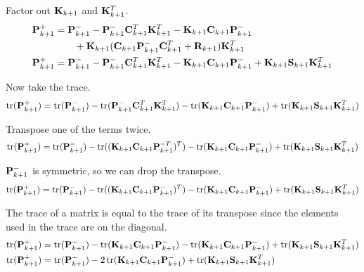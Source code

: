 Factor out $\mathbf{K}_{k+1}$ and $\mathbf{K}_{k+1}^T$.
\begin{align}
  \mathbf{P}_{k+1}^+ &=
    \mathbf{P}_{k+1}^- - \mathbf{P}_{k+1}^-\mathbf{C}_{k+1}^T\mathbf{K}_{k+1}^T -
    \mathbf{K}_{k+1}\mathbf{C}_{k+1}\mathbf{P}_{k+1}^- \nonumber \\
    &\qquad + \mathbf{K}_{k+1}(\mathbf{C}_{k+1}\mathbf{P}_{k+1}^-\mathbf{C}_{k+1}^T +
    \mathbf{R}_{k+1})\mathbf{K}_{k+1}^T \nonumber \\
  \mathbf{P}_{k+1}^+ &=
    \mathbf{P}_{k+1}^- - \mathbf{P}_{k+1}^-\mathbf{C}_{k+1}^T\mathbf{K}_{k+1}^T -
    \mathbf{K}_{k+1}\mathbf{C}_{k+1}\mathbf{P}_{k+1}^- +
    \mathbf{K}_{k+1}\mathbf{S}_{k+1}\mathbf{K}_{k+1}^T \label{eq:post_p_update}
\end{align}

Now take the trace.
\begin{equation*}
  \operatorname{tr}(\mathbf{P}_{k+1}^+) =
    \operatorname{tr}(\mathbf{P}_{k+1}^-) - \operatorname{tr}(\mathbf{P}_{k+1}^-\mathbf{C}_{k+1}^T\mathbf{K}_{k+1}^T) -
    \operatorname{tr}(\mathbf{K}_{k+1}\mathbf{C}_{k+1}\mathbf{P}_{k+1}^-) +
    \operatorname{tr}(\mathbf{K}_{k+1}\mathbf{S}_{k+1}\mathbf{K}_{k+1}^T)
\end{equation*}

Transpose one of the terms twice.
\begin{equation*}
  \operatorname{tr}(\mathbf{P}_{k+1}^+) = \operatorname{tr}(\mathbf{P}_{k+1}^-) -
    \operatorname{tr}((\mathbf{K}_{k+1}\mathbf{C}_{k+1}\mathbf{P}_{k+1}^{-T})^T) -
    \operatorname{tr}(\mathbf{K}_{k+1}\mathbf{C}_{k+1}\mathbf{P}_{k+1}^-) +
    \operatorname{tr}(\mathbf{K}_{k+1}\mathbf{S}_{k+1}\mathbf{K}_{k+1}^T)
\end{equation*}

$\mathbf{P}_{k+1}^-$ is symmetric, so we can drop the transpose.
\begin{equation*}
  \operatorname{tr}(\mathbf{P}_{k+1}^+) = \operatorname{tr}(\mathbf{P}_{k+1}^-) -
    \operatorname{tr}((\mathbf{K}_{k+1}\mathbf{C}_{k+1}\mathbf{P}_{k+1}^-)^T) -
    \operatorname{tr}(\mathbf{K}_{k+1}\mathbf{C}_{k+1}\mathbf{P}_{k+1}^-) +
    \operatorname{tr}(\mathbf{K}_{k+1}\mathbf{S}_{k+1}\mathbf{K}_{k+1}^T)
\end{equation*}

The trace of a matrix is equal to the trace of its transpose since the elements
used in the trace are on the diagonal.
\begin{align*}
  \operatorname{tr}(\mathbf{P}_{k+1}^+) &= \operatorname{tr}(\mathbf{P}_{k+1}^-) -
    \operatorname{tr}(\mathbf{K}_{k+1}\mathbf{C}_{k+1}\mathbf{P}_{k+1}^-) -
    \operatorname{tr}(\mathbf{K}_{k+1}\mathbf{C}_{k+1}\mathbf{P}_{k+1}^-) +
    \operatorname{tr}(\mathbf{K}_{k+1}\mathbf{S}_{k+1}\mathbf{K}_{k+1}^T) \\
  \operatorname{tr}(\mathbf{P}_{k+1}^+) &= \operatorname{tr}(\mathbf{P}_{k+1}^-) -
    2\operatorname{tr}(\mathbf{K}_{k+1}\mathbf{C}_{k+1}\mathbf{P}_{k+1}^-) +
    \operatorname{tr}(\mathbf{K}_{k+1}\mathbf{S}_{k+1}\mathbf{K}_{k+1}^T)
\end{align*}

